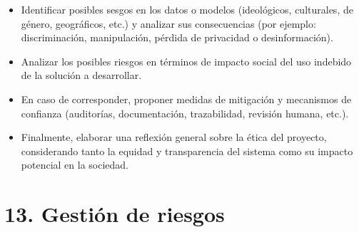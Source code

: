 \documentclass[
11pt, %
]{charter}
\begin{document}
\begin{itemize}
	\item Identificar posibles sesgos en los datos o modelos (ideológicos, culturales, de género, geográficos, etc.) y analizar sus consecuencias (por ejemplo: discriminación, manipulación, pérdida de privacidad o desinformación).
	\item Analizar los posibles riesgos en términos de impacto social del uso indebido de la solución a desarrollar.
	\item En caso de corresponder, proponer medidas de mitigación y mecanismos de confianza (auditorías, documentación, trazabilidad, revisión humana, etc.).
	\item Finalmente, elaborar una reflexión general sobre la ética del proyecto, considerando tanto la equidad y transparencia del sistema como su impacto potencial en la sociedad.

\end{itemize}


\section{13. Gestión de riesgos}
\label{sec:riesgos}
\end{document}
